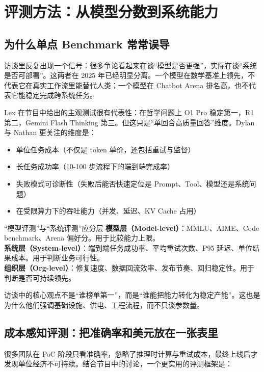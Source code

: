 \section{评测方法：从模型分数到系统能力}

\subsection{为什么单点 Benchmark 常常误导}

访谈里反复出现一个信号：很多争论看起来在谈``模型是否更强''，实际在谈``系统是否可部署''。这两者在 2025 年已经明显分离。一个模型在数学基准上领先，不代表它在真实工作流里能替代人类；一个模型在 Chatbot Arena 排名高，也不代表它能稳定完成跨系统任务。

Lex 在节目中给出的主观测试很有代表性：在哲学问题上 O1 Pro 稳定第一，R1 第二，Gemini Flash Thinking 第三。但这只是``单回合高质量回答''维度。Dylan 与 Nathan 更关注的维度是：
\begin{itemize}
    \item 单位任务成本（不仅是 token 单价，还包括重试与监督）
    \item 长任务成功率（10-100 步流程下的端到端完成率）
    \item 失败模式可诊断性（失败后能否快速定位是 Prompt、Tool、模型还是系统问题）
    \item 在受限算力下的吞吐能力（并发、延迟、KV Cache 占用）
\end{itemize}

\begin{knowledgebox}{``模型评测''与``系统评测''应分层}
\textbf{模型层（Model-level）}：MMLU、AIME、Code benchmark、Arena 偏好分。用于比较能力上限。\\
\textbf{系统层（System-level）}：端到端任务成功率、平均重试次数、P95 延迟、单位结果成本。用于判断业务可行性。\\
\textbf{组织层（Org-level）}：修复速度、数据回流效率、发布节奏、回归稳定性。用于判断是否可持续领先。

访谈中的核心观点不是``谁榜单第一''，而是``谁能把能力转化为稳定产能''。这也是为什么他们强调基础设施、供电、工程流程，而不只谈参数量。
\end{knowledgebox}

\subsection{成本感知评测：把准确率和美元放在一张表里}

很多团队在 PoC 阶段只看准确率，忽略了推理时计算与重试成本，最终上线后才发现单位经济不可持续。结合节目中的讨论，一个更实用的评测框架是：

